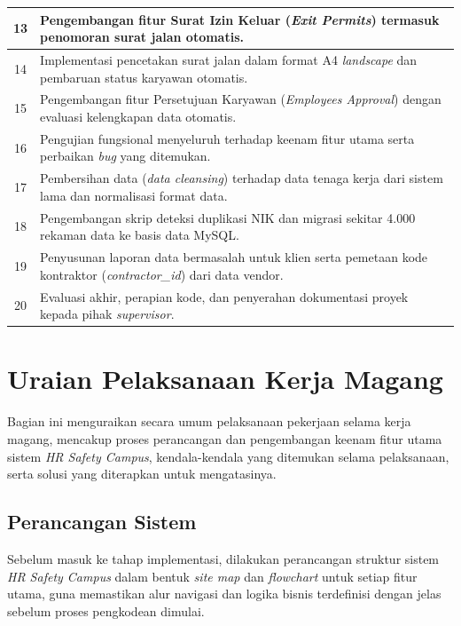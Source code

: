 \begin{longtable}{|c | p{}| }
	\hline
	13 & Pengembangan fitur Surat Izin Keluar (\textit{Exit Permits}) termasuk penomoran surat jalan otomatis. \\
	\hline
	14 & Implementasi pencetakan surat jalan dalam format A4 \textit{landscape} dan pembaruan status karyawan otomatis. \\
	\hline
	15 & Pengembangan fitur Persetujuan Karyawan (\textit{Employees Approval}) dengan evaluasi kelengkapan data otomatis. \\
	\hline
	16 & Pengujian fungsional menyeluruh terhadap keenam fitur utama serta perbaikan \textit{bug} yang ditemukan. \\
	\hline
	17 & Pembersihan data (\textit{data cleansing}) terhadap data tenaga kerja dari sistem lama dan normalisasi format data. \\
	\hline
	18 & Pengembangan skrip deteksi duplikasi NIK dan migrasi sekitar 4.000 rekaman data ke basis data MySQL. \\
	\hline
	19 & Penyusunan laporan data bermasalah untuk klien serta pemetaan kode kontraktor (\textit{contractor\_id}) dari data vendor. \\
	\hline
	20 & Evaluasi akhir, perapian kode, dan penyerahan dokumentasi proyek kepada pihak \textit{supervisor}. \\
\end{longtable}

\section{Uraian Pelaksanaan Kerja Magang}
Bagian ini menguraikan secara umum pelaksanaan pekerjaan selama kerja magang, mencakup proses perancangan dan pengembangan keenam fitur utama sistem \textit{HR Safety Campus}, kendala-kendala yang ditemukan selama pelaksanaan, serta solusi yang diterapkan untuk mengatasinya.

\subsection{Perancangan Sistem}
Sebelum masuk ke tahap implementasi, dilakukan perancangan struktur sistem \textit{HR Safety Campus} dalam bentuk \textit{site map} dan \textit{flowchart} untuk setiap fitur utama, guna memastikan alur navigasi dan logika bisnis terdefinisi dengan jelas sebelum proses pengkodean dimulai.

